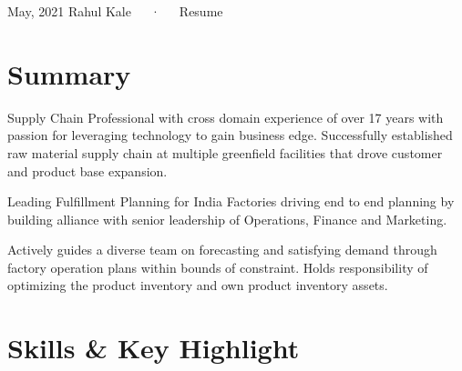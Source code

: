 \documentclass[11pt, a4paper]{awesome-cv}
\begin{document}
\makecvheader

\makecvfooter
  {May, 2021}
    {Rahul Kale~~~·~~~Resume}
  {\thepage}





\hypertarget{summary}{%
\section{Summary}\label{summary}}

Supply Chain Professional with cross domain experience of over 17 years
with passion for leveraging technology to gain business edge.
Successfully established raw material supply chain at multiple
greenfield facilities that drove customer and product base expansion.

Leading Fulfillment Planning for India Factories driving end to end
planning by building alliance with senior leadership of Operations,
Finance and Marketing.

Actively guides a diverse team on forecasting and satisfying demand
through factory operation plans within bounds of constraint. Holds
responsibility of optimizing the product inventory and own product
inventory assets.

\hypertarget{skills-key-highlight}{%
\section{Skills \& Key Highlight}\label{skills-key-highlight}}
\end{document}
